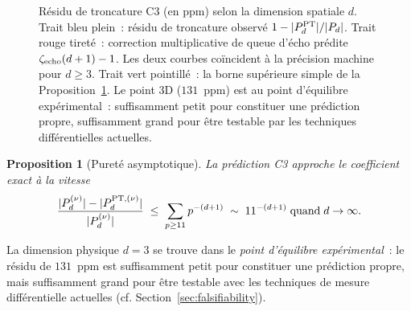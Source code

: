 \documentclass[11pt,a4paper]{article}
\newtheorem{proposition}{Proposition}
\begin{document}
\begin{figure}[ht]
\centering
{}
\caption{Résidu de troncature C3 (en ppm) selon la dimension spatiale $d$. Trait bleu plein~:
résidu de troncature observé $1 - |P_d^{\rm PT}|/|P_d|$. Trait rouge tireté~: correction
multiplicative de queue d'écho prédite $\zeta_{\rm echo}(d+1) - 1$. Les deux courbes coïncident
à la précision machine pour $d \geq 3$. Trait vert pointillé~: la borne supérieure simple de
la Proposition~\ref{prop:asymptotic}. Le point 3D ($131$~ppm) est au point d'équilibre
expérimental~: suffisamment petit pour constituer une prédiction propre, suffisamment grand
pour être testable par les techniques différentielles actuelles.}
\label{fig:c3-vs-d}
\end{figure}

\begin{proposition}[Pureté asymptotique]
\label{prop:asymptotic}
La prédiction C3 approche le coefficient exact à la vitesse
\begin{equation}
\frac{|P_{d}^{(\nu)}| - |P_{d}^{{\rm PT},(\nu)}|}{|P_{d}^{(\nu)}|} \;\leq\; \sum_{p \geq 11} p^{-(d+1)} \;\sim\; 11^{-(d+1)}\;\text{quand}\;d \to \infty.
\end{equation}
\end{proposition}

La dimension physique $d = 3$ se trouve dans le \emph{point d'équilibre expérimental}~: le résidu
de $131$~ppm est suffisamment petit pour constituer une prédiction propre, mais suffisamment grand
pour être testable avec les techniques de mesure différentielle actuelles (cf.
Section~\ref{sec:falsifiability}).
\end{document}
